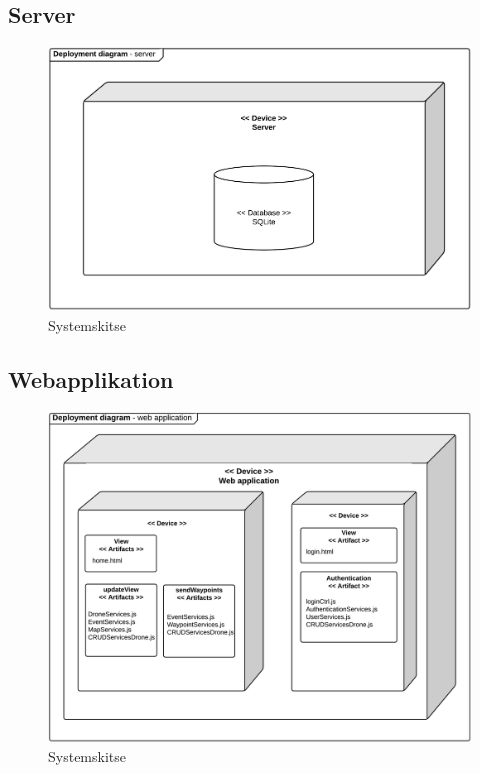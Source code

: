 \newpage
\subsection{Server}

\begin{figure}[H]
\centering
\includegraphics[width=1\textwidth]{Billeder/deployment_server.png}
\caption{Systemskitse}
\label{fig:deployment_server}
\end{figure}

\newpage
\subsection{Webapplikation}

\begin{figure}[H]
\centering
\includegraphics[width=1\textwidth]{Billeder/deployment_webapp.png}
\caption{Systemskitse}
\label{fig:deployment_webapp}
\end{figure}

\newpage

